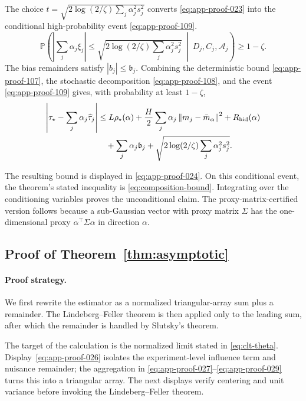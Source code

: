 \documentclass[11pt]{article}
\numberwithin{equation}{section}
\newcommand{\Pbb}{\mathbb P}
\newcommand{\1}{\mathbf 1}
\newcommand{\cA}{\mathcal A}
\newcommand{\norm}[1]{\left\lVert #1\right\rVert}
\newcommand{\abs}[1]{\left\lvert #1\right\rvert}
\begin{document}
The choice \(t=\sqrt{2\log(2/\zeta)\sum_j\alpha_j^2s_j^2}\) converts
\eqref{eq:app-proof-023} into the conditional high-probability event
\eqref{eq:app-proof-109}.
\begin{equation}
\label{eq:app-proof-109}
  \Pbb\left(
  \abs{\sum_j\alpha_j\xi_j}
  \leq
  \sqrt{2\log(2/\zeta)\sum_j\alpha_j^2s_j^2}
  \ \middle|\ D_j,C_j,\cA_j
  \right)
  \geq 1-\zeta.
\end{equation}
The bias remainders satisfy \(\abs{b_j}\le\mathfrak b_j\).  Combining the
deterministic bound \eqref{eq:app-proof-107}, the stochastic decomposition
\eqref{eq:app-proof-108}, and the event \eqref{eq:app-proof-109} gives, with
probability at least \(1-\zeta\),
\begin{equation}
\label{eq:app-proof-024}
\begin{aligned}
\abs{\tau_\star-\sum_j\alpha_j\widehat\tau_j}
&\le L\rho_\star(\alpha)
+\frac{H}{2}\sum_j\alpha_j\norm{m_j-\bar m_\alpha}^2
+R_{\rm hid}(\alpha)\\
&\quad+\sum_j\alpha_j\mathfrak b_j
+\sqrt{2\log(2/\zeta)\sum_j\alpha_j^2s_j^2}.
\end{aligned}
\end{equation}

The resulting bound is displayed in \eqref{eq:app-proof-024}.  On this conditional event, the theorem's stated inequality is \eqref{eq:composition-bound}.  Integrating over the
conditioning variables proves the unconditional claim.  The proxy-matrix-certified version follows because a sub-Gaussian vector with
proxy matrix \(\Sigma\) has the one-dimensional proxy
\(\alpha^\top\Sigma\alpha\) in direction \(\alpha\).

\subsection{Proof of Theorem~\ref{thm:asymptotic}}
\label{app:proof-thm-asymptotic}

\paragraph{Proof strategy.} We first rewrite the estimator as a normalized triangular-array sum plus a remainder.  The Lindeberg--Feller theorem is then applied only to the leading sum, after which the remainder is handled by Slutsky's theorem.

The target of the calculation is the normalized limit stated in
\eqref{eq:clt-theta}.  Display~\eqref{eq:app-proof-026} isolates the
experiment-level influence term and nuisance remainder; the aggregation in
\eqref{eq:app-proof-027}--\eqref{eq:app-proof-029} turns this into a triangular
array.  The next displays verify centering and unit variance before invoking
the Lindeberg--Feller theorem.
\end{document}
